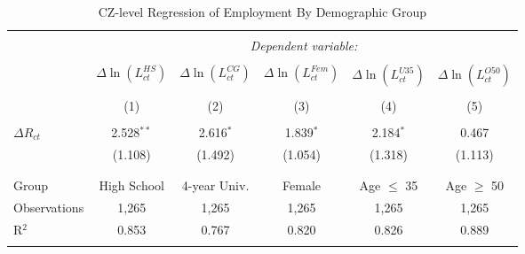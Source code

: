
\begin{table}[!t] \centering 
  \caption{CZ-level Regression of Employment By Demographic Group} 
  \label{cz_tab_8_panel_A} 
\begin{tabular}{@{\extracolsep{5pt}}lccccc} 
\\[-1.8ex]\hline 
\hline \\[-1.8ex] 
 & \multicolumn{5}{c}{\textit{Dependent variable:}} \\ 
\cline{2-6} 
\\[-1.8ex] & $\Delta \ln(L^{HS}_{ct})$ & $\Delta \ln(L^{CG}_{ct})$ & $\Delta \ln(L^{Fem}_{ct})$ & $\Delta \ln(L^{U35}_{ct})$ & $\Delta \ln(L^{O50}_{ct})$ \\ 
\\[-1.8ex] & (1) & (2) & (3) & (4) & (5)\\ 
\hline \\[-1.8ex] 
 $\Delta R_{ct}$ & 2.528$^{**}$ & 2.616$^{*}$ & 1.839$^{*}$ & 2.184$^{*}$ & 0.467 \\ 
  & (1.108) & (1.492) & (1.054) & (1.318) & (1.113) \\ 
  & & & & & \\ 
\hline \\[-1.8ex] 
Group & High School & 4-year Univ. & Female & Age $\leq$ 35 & Age $\geq$ 50 \\ 
Observations & 1,265 & 1,265 & 1,265 & 1,265 & 1,265 \\ 
R$^{2}$ & 0.853 & 0.767 & 0.820 & 0.826 & 0.889 \\ 
\hline 
\hline \\[-1.8ex] 
\end{tabular} 
\end{table} 
